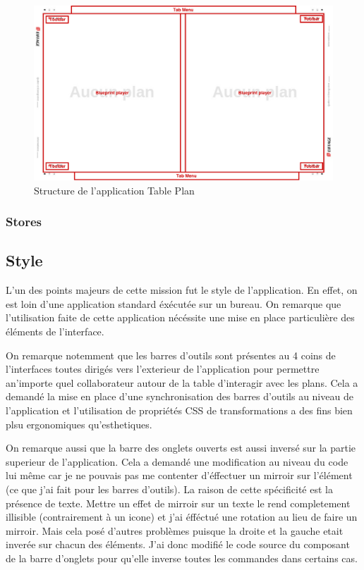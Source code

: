 \begin{figure}[h]
    \centering
    \includegraphics[scale=0.5]{img/table-plan-structure.pdf}
    \caption{Structure de l'application Table Plan}
\end{figure}

\subsubsection{Stores}
\label{eiffageTablePlanStores}


\subsection{Style}
\label{eiffageTablePlanStyle}

L'un des points majeurs de cette mission fut le style de l'application.
En effet, on est loin d'une application standard éxécutée sur un bureau.
On remarque que l'utilisation faite de cette application nécéssite une mise en place particulière des éléments de l'interface.

On remarque notemment que les barres d'outils sont présentes au 4 coins de l'interfaces toutes dirigés vers l'exterieur de l'application pour permettre an'importe quel collaborateur autour de la table d'interagir avec les plans.
Cela a demandé la mise en place d'une synchronisation des barres d'outils au niveau de l'application et l'utilisation de propriétés CSS de transformations a des fins bien plsu ergonomiques qu'esthetiques.

\bigskip

On remarque aussi que la barre des onglets ouverts est aussi inversé sur la partie superieur de l'application.
Cela a demandé une modification au niveau du code lui même car je ne pouvais pas me contenter d'éffectuer un mirroir sur l'élément (ce que j'ai fait pour les barres d'outils).
La raison de cette spécificité est la présence de texte.
Mettre un effet de mirroir sur un texte le rend completement illisible (contrairement à un icone) et j'ai éfféctué une rotation au lieu de faire un mirroir.
Mais cela posé d'autres problèmes puisque la droite et la gauche etait inverée sur chacun des éléments.
J'ai donc modifié le code source du composant de la barre d'onglets pour qu'elle inverse toutes les commandes dans certains cas.

